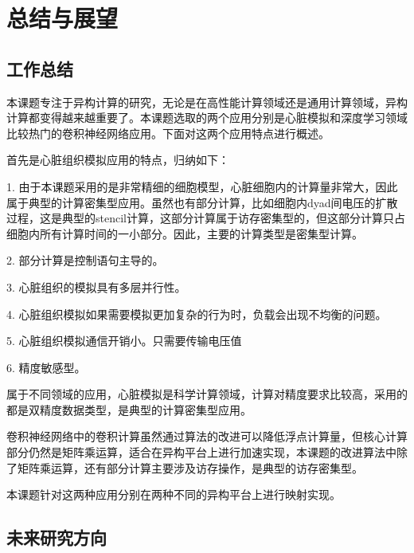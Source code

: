 \chapter{总结与展望}
\section{工作总结}
本课题专注于异构计算的研究，无论是在高性能计算领域还是通用计算领域，异构计算都变得越来越重要了。本课题选取的两个应用分别是心脏模拟和深度学习领域比较热门的卷积神经网络应用。下面对这两个应用特点进行概述。

首先是心脏组织模拟应用的特点，归纳如下：

\begin{compactitem}
\item[1.]
由于本课题采用的是非常精细的细胞模型，心脏细胞内的计算量非常大，因此属于典型的计算密集型应用。虽然也有部分计算，比如细胞内dyad间电压的扩散过程，这是典型的stencil计算，这部分计算属于访存密集型的，但这部分计算只占细胞内所有计算时间的一小部分。因此，主要的计算类型是密集型计算。

\item[2.]
部分计算是控制语句主导的。

\item[3.]
心脏组织的模拟具有多层并行性。

\item[4.]
心脏组织模拟如果需要模拟更加复杂的行为时，负载会出现不均衡的问题。

\item[5.]
心脏组织模拟通信开销小。只需要传输电压值

\item[6.]
精度敏感型。

\end{compactitem}

属于不同领域的应用，心脏模拟是科学计算领域，计算对精度要求比较高，采用的都是双精度数据类型，是典型的计算密集型应用。

卷积神经网络中的卷积计算虽然通过算法的改进可以降低浮点计算量，但核心计算部分仍然是矩阵乘运算，适合在异构平台上进行加速实现，本课题的改进算法中除了矩阵乘运算，还有部分计算主要涉及访存操作，是典型的访存密集型。

本课题针对这两种应用分别在两种不同的异构平台上进行映射实现。

\section{未来研究方向}



